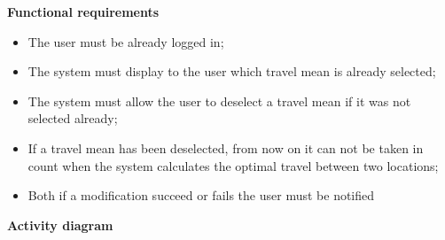 \documentclass{article}
\begin{document}
	\bigskip
	\noindent
	\textbf{Functional requirements} \\
	\begin{itemize}
		\item The user must be already logged in;
		\item The system must display to the user which travel mean is already selected;
		\item The system must allow the user to deselect a travel mean if it was not selected already;
		\item If a travel mean has been deselected, from now on it can not be taken in count when the system calculates the optimal travel between two locations;
		\item Both if a modification succeed or fails the user must be notified
	\end{itemize}
	
	\newpage
	\noindent
	\textbf{Activity diagram} \\
	
\end{document}
